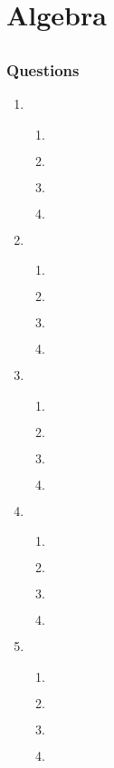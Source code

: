 \chapter{Algebra}
\section{}
\subsection{Questions}
\begin{multicols}{2}
\begin{enumerate}[label={\arabic*.}]
\item
	\begin{enumerate}[label={\Alph*.}]
	\item \(\)
	\item \(\)
	\item \(\)
	\item \(\)
	\end{enumerate}
\item
	\begin{enumerate}[label={\Alph*.}]
	\item \(\)
	\item \(\)
	\item \(\)
	\item \(\)
	\end{enumerate}
\item
	\begin{enumerate}[label={\Alph*.}]
	\item \(\)
	\item \(\)
	\item \(\)
	\item \(\)
	\end{enumerate}
\item
	\begin{enumerate}[label={\Alph*.}]
	\item \(\)
	\item \(\)
	\item \(\)
	\item \(\)
	\end{enumerate}
\item
	\begin{enumerate}[label={\Alph*.}]
	\item \(\)
	\item \(\)
	\item \(\)
	\item \(\)
	\end{enumerate}

\end{enumerate}
\end{multicols}
